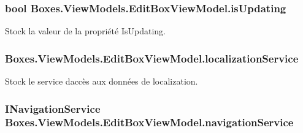\subsubsection[{\texorpdfstring{is\+Updating}{isUpdating}}]{\setlength{\rightskip}{0pt plus 5cm}bool Boxes.\+View\+Models.\+Edit\+Box\+View\+Model.\+is\+Updating\hspace{0.3cm}{\ttfamily [private]}}\hypertarget{class_boxes_1_1_view_models_1_1_edit_box_view_model_a4c9a3ff1136d89cb873a0af3dd77a25a}{}\label{class_boxes_1_1_view_models_1_1_edit_box_view_model_a4c9a3ff1136d89cb873a0af3dd77a25a}


Stock la valeur de la propriété {\ttfamily Is\+Updating}. 

\subsubsection[{\texorpdfstring{localization\+Service}{localizationService}}]{ Boxes.\+View\+Models.\+Edit\+Box\+View\+Model.\+localization\+Service\hspace{0.3cm}{\ttfamily [private]}}\hypertarget{class_boxes_1_1_view_models_1_1_edit_box_view_model_afe7557739bc131aa155ccd6812df37c4}{}\label{class_boxes_1_1_view_models_1_1_edit_box_view_model_afe7557739bc131aa155ccd6812df37c4}


Stock le service d\textquotesingle{}accès aux données de localization. 

\subsubsection[{\texorpdfstring{navigation\+Service}{navigationService}}]{\setlength{\rightskip}{0pt plus 5cm}I\+Navigation\+Service Boxes.\+View\+Models.\+Edit\+Box\+View\+Model.\+navigation\+Service\hspace{0.3cm}{\ttfamily [private]}}\hypertarget{class_boxes_1_1_view_models_1_1_edit_box_view_model_a5af96228bc2a2bebdd4372862829c46d}{}\label{class_boxes_1_1_view_models_1_1_edit_box_view_model_a5af96228bc2a2bebdd4372862829c46d}


